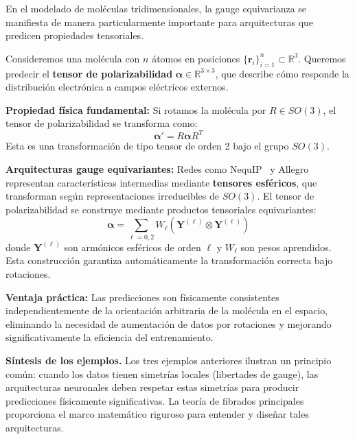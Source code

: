 \begin{example}\label{ex:gauge_moleculas}
En el modelado de moléculas tridimensionales, la gauge equivarianza se manifiesta de manera particularmente importante para arquitecturas que predicen propiedades tensoriales.

Consideremos una molécula con $n$ átomos en posiciones $\{\mathbf{r}_i\}_{i=1}^n \subset \mathbb{R}^3$. Queremos predecir el \textbf{tensor de polarizabilidad} $\boldsymbol{\alpha} \in \mathbb{R}^{3 \times 3}$, que describe cómo responde la distribución electrónica a campos eléctricos externos.

\textbf{Propiedad física fundamental:} Si rotamos la molécula por $R \in SO(3)$, el tensor de polarizabilidad se transforma como:
\begin{equation}
\boldsymbol{\alpha}' = R \boldsymbol{\alpha} R^T
\end{equation}
Esta es una transformación de tipo tensor de orden 2 bajo el grupo $SO(3)$.

\textbf{Arquitecturas gauge equivariantes:} Redes como NequIP~\citep{batzner2022nequip} y Allegro representan características intermedias mediante \textbf{tensores esféricos}, que transforman según representaciones irreducibles de $SO(3)$. El tensor de polarizabilidad se construye mediante productos tensoriales equivariantes:
\begin{equation}
\boldsymbol{\alpha} = \sum_{\ell=0,2} W_\ell \left( \mathbf{Y}^{(\ell)} \otimes \mathbf{Y}^{(\ell)} \right)
\end{equation}
donde $\mathbf{Y}^{(\ell)}$ son armónicos esféricos de orden $\ell$ y $W_\ell$ son pesos aprendidos. Esta construcción garantiza automáticamente la transformación correcta bajo rotaciones.

\textbf{Ventaja práctica:} Las predicciones son físicamente consistentes independientemente de la orientación arbitraria de la molécula en el espacio, eliminando la necesidad de aumentación de datos por rotaciones y mejorando significativamente la eficiencia del entrenamiento.
\end{example}

\textbf{Síntesis de los ejemplos.} Los tres ejemplos anteriores ilustran un principio común: cuando los datos tienen simetrías locales (libertades de gauge), las arquitecturas neuronales deben respetar estas simetrías para producir predicciones físicamente significativas. La teoría de fibrados principales proporciona el marco matemático riguroso para entender y diseñar tales arquitecturas.

